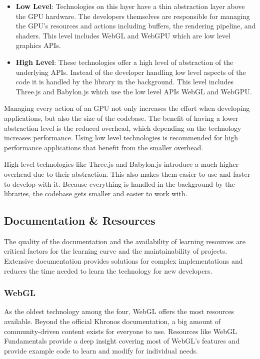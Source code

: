 \begin{itemize}
    \item \textbf{Low Level}: Technologies on this layer have a thin abstraction layer above the GPU hardware. The developers themselves are responsible for managing the GPU's resources and actions including buffers, the rendering pipeline, and shaders. This level includes WebGL and WebGPU which are low level graphics APIs.
    \item \textbf{High Level}: These technologies offer a high level of abstraction of the underlying APIs. Instead of the developer handling low level aspects of the code it is handled by the library in the background. This level includes Three.js and Babylon.js which use the low level APIs WebGL and WebGPU\@.
\end{itemize}

Managing every action of an GPU not only increases the effort when developing applications, but also the size of the codebase. The benefit of having a lower abstraction level is the reduced overhead, which depending on the technology increases performance. Using low level technologies is recommended for high performance applications that benefit from the smaller overhead.

High level technologies like Three.js and Babylon.js introduce a much higher overhead due to their abstraction. This also makes them easier to use and faster to develop with it. Because everything is handled in the background by the libraries, the codebase gets smaller and easier to work with. 



\subsection{Documentation \& Resources}

The quality of the documentation and the availability of learning resources are critical factors for the learning curve and the maintainability of projects. Extensive documentation provides solutions for complex implementations and reduces the time needed to learn the technology for new developers.

\subsubsection{WebGL}
As the oldest technology among the four, WebGL offers the most resources available. Beyond the official Khronos documentation, a big amount of community-driven content exists for everyone to use. Resources like WebGL Fundamentals provide a deep insight covering most of WebGL's features and provide example code to learn and modify for individual needs.

